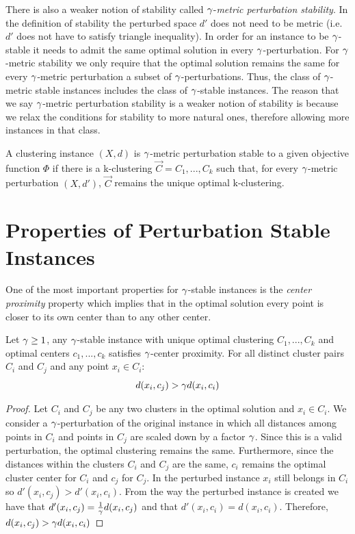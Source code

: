 There is also a weaker notion of stability called $\gamma$-\emph{metric perturbation stability}. In the definition of stability the perturbed space $d'$ does not need to be metric (i.e. $d'$ does not have to satisfy triangle inequality). In order for an instance to be $\gamma$-stable it needs to admit the same optimal solution in every $\gamma$-perturbation. For $\gamma$-metric stability we only require that the optimal solution remains the same for every $\gamma$-metric perturbation a subset of $\gamma$-perturbations. Thus, the class of $\gamma$-metric stable instances includes the class of $\gamma$-stable instances. The reason that we say $\gamma$-metric perturbation stability is a weaker notion of stability is because we relax the conditions for stability to more natural ones, therefore allowing more instances in that class.

\begin{definition} \label{metricPer}
A clustering instance $(X, d)$ is $\gamma$-metric perturbation stable to a given objective function $\Phi$ if there is a k-clustering $\vec{C}= C_1, . . . , C_k$ such that, for every $\gamma$-metric perturbation $(X, d')$, $\vec{C}$ remains the unique optimal k-clustering.
\end{definition}


\section{Properties of Perturbation Stable Instances}


One of the most important properties for $\gamma$-stable instances is the \emph{center proximity} property which  implies that in the optimal solution every point is closer to its own center than to any other center.
\begin{definition}\label{Cprox}
Let $\gamma \ge 1$, any $\gamma$-stable instance with unique optimal clustering $C_1, . . . , C_k$ and optimal centers $c_1, . . . , c_k$ satisfies $\gamma$-center proximity. For all distinct cluster pairs $C_i$ and $C_j$ and any point $x_i\in C_i$: 
\[d(x_i,c_j)>\gamma d(x_i,c_i) \]
\end{definition}
\begin{proof}
Let $C_i$ and $C_j$ be any two clusters in the optimal solution and $x_i \in C_i$. We consider a $\gamma$-perturbation of the original instance in which all distances among points in $C_i$ and points in $C_j$ are scaled down by a factor $\gamma$. Since this is a valid perturbation, the optimal clustering remains the same. Furthermore, since the distances within the clusters $C_i$ and $C_j$ are the same, $c_i$ remains the optimal cluster center for $C_i$ and $c_j$ for $C_j$. In the perturbed instance $x_i$ still belongs in $C_i$ so $d'(x_i,c_j) > d'(x_i,c_i)$. From the way the perturbed instance is created we have that $d'(x_i,c_j)=\frac{1}{\gamma} d(x_i,c_j)$ and that $d'(x_i,c_i) = d(x_i,c_i)$. Therefore,  $d(x_i,c_j) > \gamma d(x_i,c_i)$
\end{proof}

